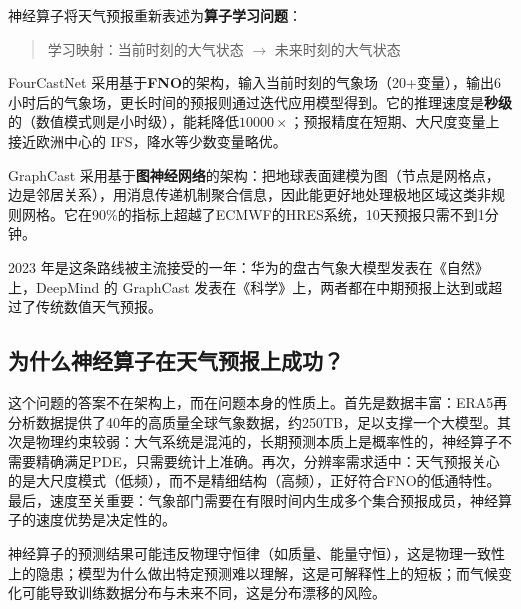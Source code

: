 神经算子将天气预报重新表述为\textbf{算子学习问题}：

\begin{quote}
学习映射：当前时刻的大气状态 $\to$ 未来时刻的大气状态
\end{quote}

\begin{example}
FourCastNet 采用基于\textbf{FNO}的架构，输入当前时刻的气象场（20+变量），输出6小时后的气象场，更长时间的预报则通过迭代应用模型得到。它的推理速度是\textbf{秒级}的（数值模式则是小时级），能耗降低$10000\times$；预报精度在短期、大尺度变量上接近欧洲中心的 IFS，降水等少数变量略优。
\end{example}

\begin{example}
GraphCast 采用基于\textbf{图神经网络}的架构：把地球表面建模为图（节点是网格点，边是邻居关系），用消息传递机制聚合信息，因此能更好地处理极地区域这类非规则网格。它在90\%的指标上超越了ECMWF的HRES系统，10天预报只需不到1分钟。
\end{example}

2023 年是这条路线被主流接受的一年：华为的盘古气象大模型发表在《自然》上，DeepMind 的 GraphCast 发表在《科学》上，两者都在中期预报上达到或超过了传统数值天气预报。

\subsection{为什么神经算子在天气预报上成功？}

这个问题的答案不在架构上，而在问题本身的性质上。首先是数据丰富：ERA5再分析数据提供了40年的高质量全球气象数据，约250TB，足以支撑一个大模型。其次是物理约束较弱：大气系统是混沌的，长期预测本质上是概率性的，神经算子不需要精确满足PDE，只需要统计上准确。再次，分辨率需求适中：天气预报关心的是大尺度模式（低频），而不是精细结构（高频），正好符合FNO的低通特性。最后，速度至关重要：气象部门需要在有限时间内生成多个集合预报成员，神经算子的速度优势是决定性的。

\begin{warning}[title = 神经算子在天气预报中的局限]
神经算子的预测结果可能违反物理守恒律（如质量、能量守恒），这是物理一致性上的隐患；模型为什么做出特定预测难以理解，这是可解释性上的短板；而气候变化可能导致训练数据分布与未来不同，这是分布漂移的风险。
\end{warning}

